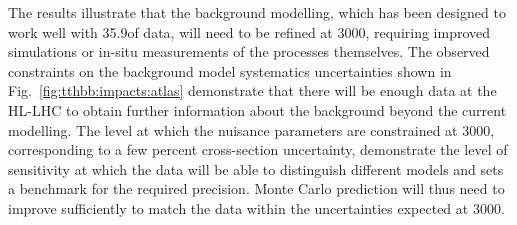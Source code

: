 The results illustrate that the background modelling, which has been designed to work well with 35.9\fbinv of data, will need to be refined at 3000\fbinv, requiring improved simulations or in-situ measurements of the \ttHF processes themselves.
The observed constraints on the \ttHF background model systematics uncertainties shown in Fig.~\ref{fig:tthbb:impacts:atlas} demonstrate that there will be enough data at the HL-LHC to obtain further information about the background beyond the current modelling. The level at which the nuisance parameters are constrained at 3000\fbinv, corresponding to a few percent cross-section uncertainty, demonstrate the level of sensitivity at which the data will be able to distinguish different models and sets a benchmark for the required precision.
Monte Carlo prediction will thus need to improve sufficiently to match the data within the uncertainties expected at 3000\fbinv.

